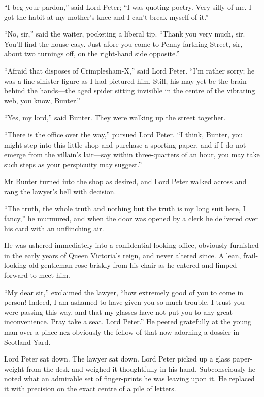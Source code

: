 \enquote{I beg your pardon,} said Lord Peter; \enquote{I was quoting poetry. Very silly of me. I got the habit at my mother’s knee and I can’t break myself of it.}

\enquote{No, sir,} said the waiter, pocketing a liberal tip. \enquote{Thank you very much, sir. You’ll find the house easy. Just afore you come to Penny-farthing Street, sir, about two turnings off, on the right-hand side opposite.}

\enquote{Afraid that disposes of Crimplesham-X,} said Lord Peter. \enquote{I’m rather sorry; he was a fine sinister figure as I had pictured him. Still, his may yet be the brain behind the hands\allowbreak---\allowbreak the aged spider sitting invisible in the centre of the vibrating web, you know, Bunter.}

\enquote{Yes, my lord,} said Bunter. They were walking up the street together.

\enquote{There is the office over the way,} pursued Lord Peter. \enquote{I think, Bunter, you might step into this little shop and purchase a sporting paper, and if I do not emerge from the villain’s lair\allowbreak---\allowbreak say within three-quarters of an hour, you may take such steps as your perspicuity may suggest.}

Mr Bunter turned into the shop as desired, and Lord Peter walked across and rang the lawyer’s bell with decision.

\enquote{The truth, the whole truth and nothing but the truth is my long suit here, I fancy,} he murmured, and when the door was opened by a clerk he delivered over his card with an unflinching air.

He was ushered immediately into a confidential-looking office, obviously furnished in the early years of Queen Victoria’s reign, and never altered since. A lean, frail-looking old gentleman rose briskly from his chair as he entered and limped forward to meet him.

\enquote{My dear sir,} exclaimed the lawyer, \enquote{how extremely good of you to come in person! Indeed, I am ashamed to have given you so much trouble. I trust you were passing this way, and that my glasses have not put you to any great inconvenience. Pray take a seat, Lord Peter.} He peered gratefully at the young man over a pince-nez obviously the fellow of that now adorning a dossier in Scotland Yard.

Lord Peter sat down. The lawyer sat down. Lord Peter picked up a glass paper-weight from the desk and weighed it thoughtfully in his hand. Subconsciously he noted what an admirable set of finger-prints he was leaving upon it. He replaced it with precision on the exact centre of a pile of letters.

